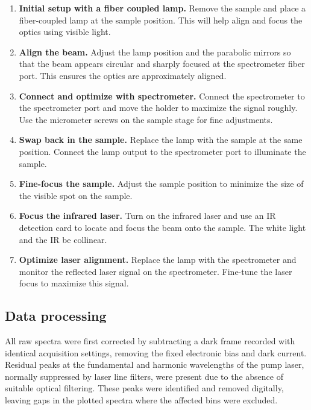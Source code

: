 \documentclass[
	a4paper,
]{scrarticle}
\begin{document}
\begin{enumerate}
  \item \textbf{Initial setup with a fiber coupled lamp.}  
  Remove the sample and place a fiber-coupled lamp at the sample position. This will help align and focus the optics using visible light.

  \item \textbf{Align the beam.}  
  Adjust the lamp position and the parabolic mirrors so that the beam appears circular and sharply focused at the spectrometer fiber port. This ensures the optics are approximately aligned.

  \item \textbf{Connect and optimize with spectrometer.}  
  Connect the spectrometer to the spectrometer port and move the holder to maximize the signal roughly. Use the micrometer screws on the sample stage for fine adjustments.

  \item \textbf{Swap back in the sample.}  
  Replace the lamp with the sample at the same position. Connect the lamp output to the spectrometer port to illuminate the sample.

  \item \textbf{Fine-focus the sample.}  
  Adjust the sample position to minimize the size of the visible spot on the sample.

  \item \textbf{Focus the infrared laser.}  
  Turn on the infrared laser and use an IR detection card to locate and focus the beam onto the sample. The white light and the IR be collinear.

  \item \textbf{Optimize laser alignment.}  
  Replace the lamp with the spectrometer and monitor the reflected laser signal on the spectrometer. Fine-tune the laser focus to maximize this signal.
\end{enumerate}

\subsection{Data processing}
All raw spectra were first corrected by subtracting a dark frame recorded with identical acquisition settings, removing the fixed electronic bias and dark current.  
Residual peaks at the fundamental and harmonic wavelengths of the pump laser, normally suppressed by laser line filters, were present due to the absence of suitable optical filtering.  
These peaks were identified and removed digitally, leaving gaps in the plotted spectra where the affected bins were excluded.  
\end{document}
